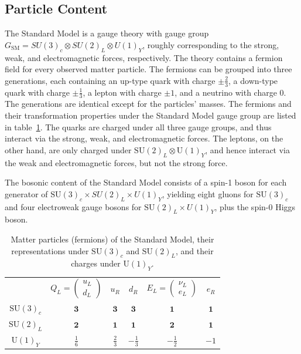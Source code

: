 \subsection{Particle Content}
The Standard Model is a gauge theory with gauge group $G_{\mathrm{SM}}=SU(3)_c\otimes SU(2)_L \otimes U(1)_Y$, roughly corresponding to the strong, weak, and electromagnetic forces, respectively. The theory contains a fermion field for every observed matter particle. The fermions can be grouped into three generations, each containing an up-type quark with charge $\pm\frac23$, a down-type quark with charge $\pm\frac13$, a lepton with charge $\pm1$, and a neutrino with charge $0$. The generations are identical except for the particles' masses. The fermions and their transformation properties under the Standard Model gauge group are listed in table~\ref{table:standard-model-particles}. The quarks are charged under all three gauge groups, and thus interact via the strong, weak, and electromagnetic forces. The leptons, on the other hand, are only charged under $\mathrm{SU}(2)_L\otimes \mathrm{U}(1)_Y$, and hence interact via the weak and electromagnetic forces, but not the strong force. 

The bosonic content of the Standard Model consists of a spin-1 boson for each generator of $\mathrm{SU}(3)_c\times SU(2)_L \times U(1)_Y$, yielding eight gluons for $\mathrm{SU}(3)_c$ and four electroweak gauge bosons for $\mathrm{SU}(2)_L\times U(1)_Y$, plus the spin-0 Higgs boson. 


\begin{table}[htbp]
	\centering
	\begin{tabular}{cccccc}
		 & $Q_L=\left(\begin{array}{c} u_L \\ d_L \end{array}\right)$ & $u_R$ & $d_R$ & $E_L=\left(\begin{array}{c} \nu_L \\ e_L \end{array}\right) $ & $e_R$ \\
		$\mathrm{SU}(3)_c$ & $\mathbf{3}$ &  $\mathbf{3}$ & $\mathbf{3}$ & $\mathbf{1}$ & $\mathbf{1}$ \\
		$\mathrm{SU}(2)_L$ & $\mathbf{2}$ & $\mathbf{1}$ & $\mathbf{1}$ & $\mathbf{2}$ & $\mathbf{1}$ \\
		$\mathrm{U}(1)_Y$ & $\frac16$ & $\frac23$ & $-\frac13$ & $-\frac12$ & $-1$ \\
	\end{tabular}
	\caption{Matter particles (fermions) of the Standard Model, their representations under $\mathrm{SU}(3)_c$ and $\mathrm{SU}(2)_L$, and their charges under $\mathrm{U}(1)_Y$.}
	\label{table:standard-model-particles}
\end{table}

